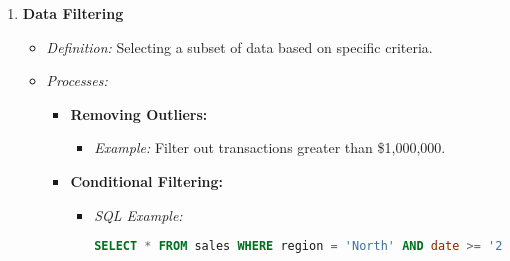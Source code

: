 \documentclass[aspectratio=169]{beamer}
\begin{document}
\begin{frame}[fragile]
\begin{enumerate}
        \item \textbf{Data Filtering}
        \begin{itemize}
            \item \textit{Definition:} Selecting a subset of data based on specific criteria.
            \item \textit{Processes:}
            \begin{itemize}
                \item \textbf{Removing Outliers:}
                \begin{itemize}
                    \item \textit{Example:} Filter out transactions greater than \$1,000,000.
                \end{itemize}
                \item \textbf{Conditional Filtering:}
                \begin{itemize}
                    \item \textit{SQL Example:}
                    \begin{lstlisting}[language=SQL]
SELECT * FROM sales WHERE region = 'North' AND date >= '2023-01-01';
                    \end{lstlisting}
                \end{itemize}
            \end{itemize}
        \end{itemize}
    \end{enumerate}
\end{frame}
\end{document}
